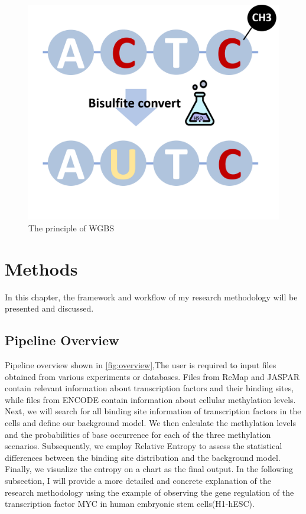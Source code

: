 \documentclass{PHlab-thesis}
\begin{document}
\begin{figure}[H]
	\centering
	\includegraphics[scale=0.65]{figures/wgbs.png}
	\caption{The principle of WGBS}
	\label{fig:wgbs} %
\end{figure}

\chapter{Methods}
In this chapter, the framework and workflow of my research methodology will be presented and discussed.
\section{Pipeline Overview}
Pipeline overview shown in \ref{fig:overview},The user is required to input files obtained from various experiments or databases. Files from ReMap and JASPAR contain relevant information about transcription factors and their binding sites, while files from ENCODE contain information about cellular methylation levels. Next, we will search for all binding site information of transcription factors in the cells and define our background model. We then calculate the methylation levels and the probabilities of base occurrence for each of the three methylation scenarios. Subsequently, we employ Relative Entropy to assess the statistical differences between the binding site distribution and the background model. Finally, we visualize the entropy on a chart as the final output. In the following subsection, I will provide a more detailed and concrete explanation of the research methodology using the example of observing the gene regulation of the transcription factor MYC in human embryonic stem cells(H1-hESC).
\end{document}
